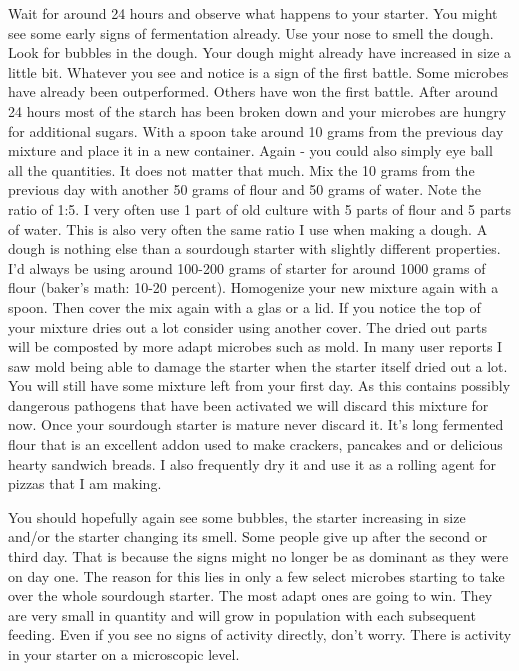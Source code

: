Wait for around 24 hours and observe what happens to your starter.
You might see some early signs of fermentation already. Use your nose
to smell the dough. Look for bubbles in the dough. Your dough
might already have increased in size a little bit. Whatever
you see and notice is a sign of the first battle. Some microbes
have already been outperformed. Others have won the first battle.
After around 24 hours most of the starch has been broken down
and your microbes are hungry for additional sugars. With a spoon
take around 10 grams from the previous day mixture and place
it in a new container. Again - you could also simply eye ball
all the quantities. It does not matter that much. Mix the 10
grams from the previous day with another 50 grams of flour
and 50 grams of water. Note the ratio of 1:5. I very often use
1 part of old culture with 5 parts of flour and 5 parts of water.
This is also very often the same ratio I use when making a dough.
A dough is nothing else than a sourdough starter with slightly different
properties. I'd always be using around 100-200 grams of starter
for around 1000 grams of flour (baker's math: 10-20 percent).
Homogenize your new mixture again with a spoon. Then cover
the mix again with a glas or a lid. If you notice the top of
your mixture dries out a lot consider using another cover. The
dried out parts will be composted by more adapt microbes such as
mold. In many user reports I saw mold being able to damage
the starter when the starter itself dried out a lot. You will
still have some mixture left from your first day. As this contains
possibly dangerous pathogens that have been activated we will discard
this mixture for now. Once your sourdough starter is mature never
discard it. It's long fermented flour that is an excellent addon
used to make crackers, pancakes and or delicious hearty sandwich
breads. I also frequently dry it and use it as a rolling agent
for pizzas that I am making.

You should hopefully again see some bubbles, the starter increasing
in size and/or the starter changing its smell. Some people give
up after the second or third day. That is because the signs might no longer
be as dominant as they were on day one. The reason for this lies in only a few
select microbes starting to take over the whole sourdough starter. The most
adapt ones are going to win. They are very small in quantity and will
grow in population with each subsequent feeding. Even if you see no signs
of activity directly, don't worry. There is activity in
your starter on a microscopic level.

